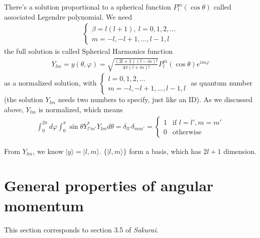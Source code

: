 \documentclass[UTF8,12pt]{article} %
\begin{document}
There's a solution proportional to a spherical function $P_{l}^{m}(\cos\theta)$ called associated Legendre polynomial. We need
\begin{align}
\begin{cases}
\beta = l(l+1),~ l = 0,1,2,... \\
m = -l, -l+1, ..., l-1, l
\end{cases}
\end{align}
the full solution is called Spherical Harmonics function
\begin{align}
Y_{lm} = y(\theta,\varphi) = \sqrt{\frac{(2l+1)(l-m)!}{4\pi(l+m)!}}P_{l}^{m}(\cos\theta) e^{im\varphi}
\end{align}
as a normalized solution, with $\begin{cases}l = 0,1,2,...\\m = -l, -l+1,..., l-1, l\end{cases}$ as quantum number (the solution $Y_{lm}$ needs two numbers to specify, just like an ID). As we discussed above, $Y_{lm}$ is normalized, which means
\begin{align}
\int_{0}^{2\pi} d\varphi \int_{0}^{\pi} \sin\theta Y_{l'm'}^{*} Y_{lm} d\theta = \delta_{ll'}\delta_{mm'} = \begin{cases}1&\text{if }l=l', m=m'\\0&\text{otherwise}\end{cases}
\end{align}

From $Y_{lm}$, we know $|y\rangle = |l,m\rangle$. $\{|l,m\rangle\}$ form a basis, which has $2l + 1$ dimension.

\section{General properties of angular momentum}

This section corresponds to section 3.5 of \textit{Sakurai}.
\end{document}
